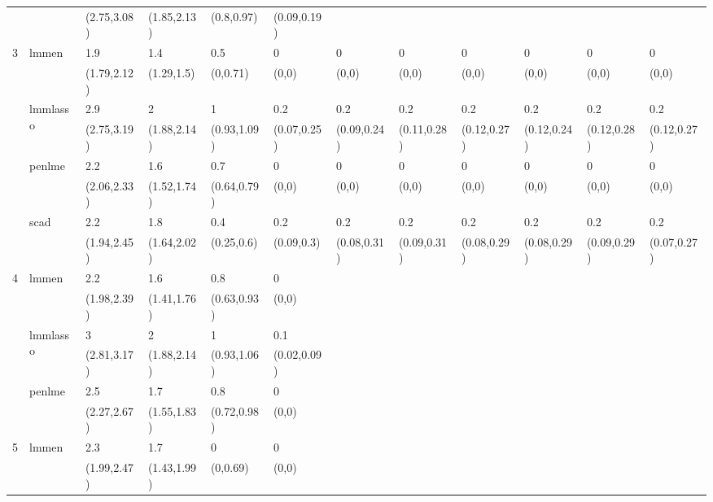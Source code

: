 \documentclass[varwidth, border={10 5 600 5}]{standalone}
\begin{document}
\begin{table}[ht]
\begin{tabular}{llllllllllll}
   &  & (2.75,3.08) & (1.85,2.13) & (0.8,0.97) & (0.09,0.19) &  &  &  &  &  &  \\ 
  \multirow{8}{*}{3} & \multirow{2}{*}{lmmen} & 1.9 & 1.4 & 0.5 & 0 & 0 & 0 & 0 & 0 & 0 & 0 \\ 
   &  & (1.79,2.12) & (1.29,1.5) & (0,0.71) & (0,0) & (0,0) & (0,0) & (0,0) & (0,0) & (0,0) & (0,0) \\ 
   & \multirow{2}{*}{lmmlasso} & 2.9 & 2 & 1 & 0.2 & 0.2 & 0.2 & 0.2 & 0.2 & 0.2 & 0.2 \\ 
   &  & (2.75,3.19) & (1.88,2.14) & (0.93,1.09) & (0.07,0.25) & (0.09,0.24) & (0.11,0.28) & (0.12,0.27) & (0.12,0.24) & (0.12,0.28) & (0.12,0.27) \\ 
   & \multirow{2}{*}{penlme} & 2.2 & 1.6 & 0.7 & 0 & 0 & 0 & 0 & 0 & 0 & 0 \\ 
   &  & (2.06,2.33) & (1.52,1.74) & (0.64,0.79) & (0,0) & (0,0) & (0,0) & (0,0) & (0,0) & (0,0) & (0,0) \\ 
   & \multirow{2}{*}{scad} & 2.2 & 1.8 & 0.4 & 0.2 & 0.2 & 0.2 & 0.2 & 0.2 & 0.2 & 0.2 \\ 
   &  & (1.94,2.45) & (1.64,2.02) & (0.25,0.6) & (0.09,0.3) & (0.08,0.31) & (0.09,0.31) & (0.08,0.29) & (0.08,0.29) & (0.09,0.29) & (0.07,0.27) \\ 
  \multirow{6}{*}{4} & \multirow{2}{*}{lmmen} & 2.2 & 1.6 & 0.8 & 0 &  &  &  &  &  &  \\ 
   &  & (1.98,2.39) & (1.41,1.76) & (0.63,0.93) & (0,0) &  &  &  &  &  &  \\ 
   & \multirow{2}{*}{lmmlasso} & 3 & 2 & 1 & 0.1 &  &  &  &  &  &  \\ 
   &  & (2.81,3.17) & (1.88,2.14) & (0.93,1.06) & (0.02,0.09) &  &  &  &  &  &  \\ 
   & \multirow{2}{*}{penlme} & 2.5 & 1.7 & 0.8 & 0 &  &  &  &  &  &  \\ 
   &  & (2.27,2.67) & (1.55,1.83) & (0.72,0.98) & (0,0) &  &  &  &  &  &  \\ 
  \multirow{2}{*}{5} & \multirow{2}{*}{lmmen} & 2.3 & 1.7 & 0 & 0 &  &  &  &  &  &  \\ 
   &  & (1.99,2.47) & (1.43,1.99) & (0,0.69) & (0,0) &  &  &  &  &  &  \\ 
   \hline
\end{tabular}
\end{table}
\end{document}
